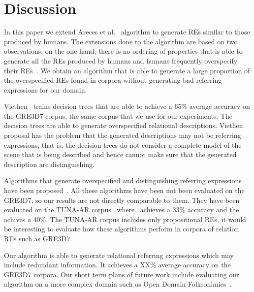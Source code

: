 \section{Discussion}
\label{sec:discussion}

In this paper we extend Areces et al.~ algorithm to generate REs similar to those produced by humans. The extensions done to the algorithm are based on two observations, on the one hand, there is no ordering of properties that is able to generate all the REs produced by humans and humans frequently overspecify their REs~\cite{Engelhardt_Bailey_Ferreira_2006,Arts_Maes_Noordman_Jansen_2011}. We obtain an algorithm that is able to generate a large proportion of the overspecified REs found in corpora without generating bad referring expressions for our domain.

Viethen~ trains decision trees that are able to achieve a 65\% average accuracy on the GRE3D7 corpus, the same corpus that we use for our experiments. The decision trees are able to generate overspecified relational descriptions. Viethen proposal has the problem that the generated descriptions may not be referring expressions, that is, the decision trees do not consider a complete model of the scene that is being described and hence cannot make sure that the generated description are distinguishing.

Algorithms that generate overspecified and distinguishing referring expressions have been proposed~\cite{delucena-paraboni:2008:ENLG,ruud-emiel-mariet:2012:INLG2012}. All these algorithms have been not been evaluated on the GRE3D7, so our results are not directly comparable to them. They have been evaluated on the TUNA-AR corpus~\cite{gatt-balz-kow:2008:ENLG} where~\cite{delucena-paraboni:2008:ENLG} achieves a 33\% accuracy and the~\cite{ruud-emiel-mariet:2012:INLG2012} achives a 40\%. The TUNA-AR corpus includes only propositional REs, it would be interesting to evaluate how these algorithms perform in corpora of relation REs such as GRE3D7. 

Our algorithm is able to generate relational referring expressions which may include redundant information. It achieves a XX\% average accuracy on the GRE3D7 corpora.
Our short term plans of future work include evaluating our algorithm on a more complex domain such as Open Domain Folksonimies~\cite{pacheco-duboue-dominguez:2012:NAACL-HLT}. 

